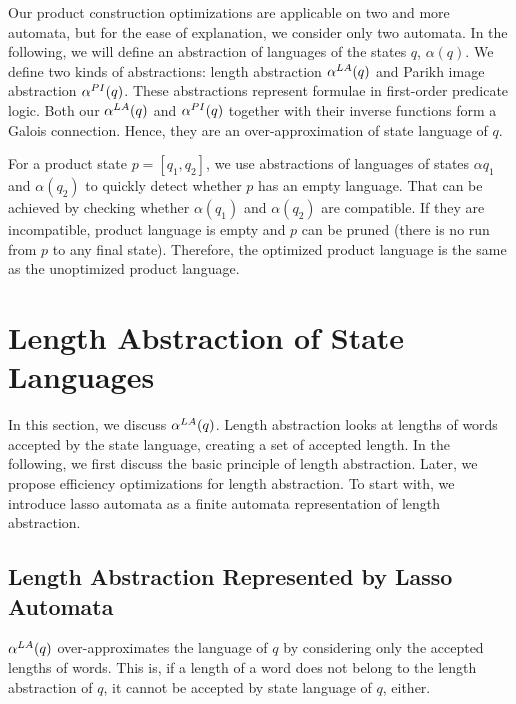 Our product construction optimizations are applicable on two and more automata, but for the ease of explanation, we consider only two automata. In the following, we will define an abstraction of languages of the states $q$, $\alpha(q)$. We define two kinds of abstractions: length abstraction $\alpha^{LA}(q)$ and Parikh image abstraction $\alpha^{PI}(q)$. These abstractions represent formulae in first-order predicate logic. Both our $\alpha^{LA}(q)$ and $\alpha^{PI}(q)$ together with their inverse functions form a Galois connection. Hence, they are an over-approximation of state language of $q$.

For a product state $p = [q_1, q_2]$, we use abstractions of languages of states $\alpha{q_1}$ and $\alpha(q_2)$ to quickly detect whether $p$ has an empty language. That can be achieved by checking whether $\alpha(q_1)$ and $\alpha(q_2)$ are compatible. If they are incompatible, product language is empty and $p$ can be pruned (there is no run from $p$ to any final state). Therefore, the optimized product language is the same as the unoptimized product language.


\section{Length Abstraction of State Languages}

In this section, we discuss $\alpha^{LA}(q)$. Length abstraction looks at lengths of words accepted by the state language, creating a set of accepted length. In the following, we first discuss the basic principle of length abstraction. Later, we propose efficiency optimizations for length abstraction. To start with, we introduce lasso automata as a finite automata representation of length abstraction.

\subsection{Length Abstraction Represented by Lasso Automata} \label{sec:length_abstraction}

$\alpha^{LA}(q)$ over-approximates the language of $q$ by considering only the accepted lengths of words. This is, if a length of a word does not belong to the length abstraction of $q$, it cannot be accepted by state language of $q$, either.

